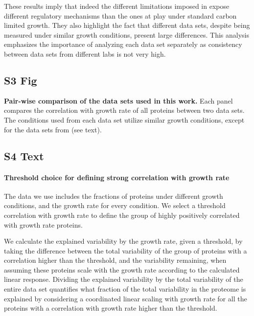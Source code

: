 \documentclass[10pt,letterpaper]{article}
\begin{document}
These results imply that indeed the different limitations imposed in \cite{Hui_2015} expose different regulatory mechanisms than the ones at play under standard carbon limited growth.
They also highlight the fact that different data sets, despite being measured under similar growth conditions, present large differences.
This analysis emphasizes the importance of analyzing each data set separately as consistency between data sets from different labs is not very high.

\subsection*{S3 Fig}
\label{fig:chemcorrcomp}
    {\bf Pair-wise comparison of the data sets used in this work.}
Each panel compares the correlation with growth rate of all proteins between two data sets.
The conditions used from each data set utilize similar growth conditions, except for the data sets from \cite{Hui_2015} (see text).

\subsection*{S4 Text}
\label{corrthreshold}
\paragraph{Threshold choice for defining strong correlation with growth rate}
The data we use includes the fractions of proteins under different growth conditions, and the growth rate for every condition.
We select a threshold correlation with growth rate to define the group of highly positively correlated with growth rate proteins.

We calculate the explained variability by the growth rate, given a threshold, by taking the difference between the total variability of the group of proteins with a correlation higher than the threshold, and the variability remaining, when assuming these proteins scale with the growth rate according to the calculated linear response.
Dividing the explained variability by the total variability of the entire data set quantifies what fraction of the total variability in the proteome is explained by considering a coordinated linear scaling with growth rate for all the proteins with a correlation with growth rate higher than the threshold.
\end{document}
